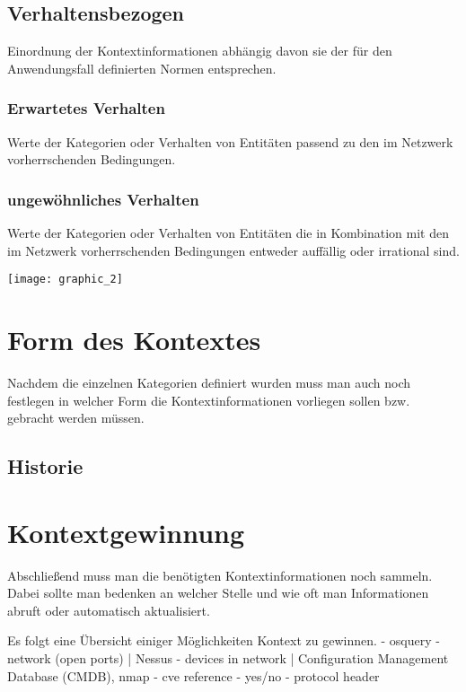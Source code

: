 \subsection{Verhaltensbezogen}
Einordnung der Kontextinformationen abhängig davon sie der für den Anwendungsfall definierten Normen entsprechen.
\subsubsection{Erwartetes Verhalten}
Werte der Kategorien oder Verhalten von Entitäten passend  zu den im Netzwerk vorherrschenden Bedingungen.
\subsubsection{ungewöhnliches Verhalten}
Werte der Kategorien oder Verhalten von Entitäten die in Kombination mit den im Netzwerk vorherrschenden Bedingungen entweder auffällig oder irrational sind.

\newpage
\texttt{[image: graphic\_2]}
\section{Form des Kontextes}
Nachdem die einzelnen Kategorien definiert wurden muss man auch noch festlegen in welcher Form die Kontextinformationen vorliegen sollen bzw. gebracht werden müssen.

\subsection{Historie}
\section{Kontextgewinnung}
Abschließend muss man die benötigten Kontextinformationen noch sammeln.
Dabei sollte man bedenken an welcher Stelle und wie oft man Informationen abruft oder automatisch aktualisiert. \cite{perera_context_2014}

  Es folgt eine Übersicht einiger Möglichkeiten Kontext zu gewinnen.    
- osquery
- network (open ports) | Nessus
- devices in network | Configuration Management Database (CMDB), nmap   
- cve reference - yes/no
- protocol header

